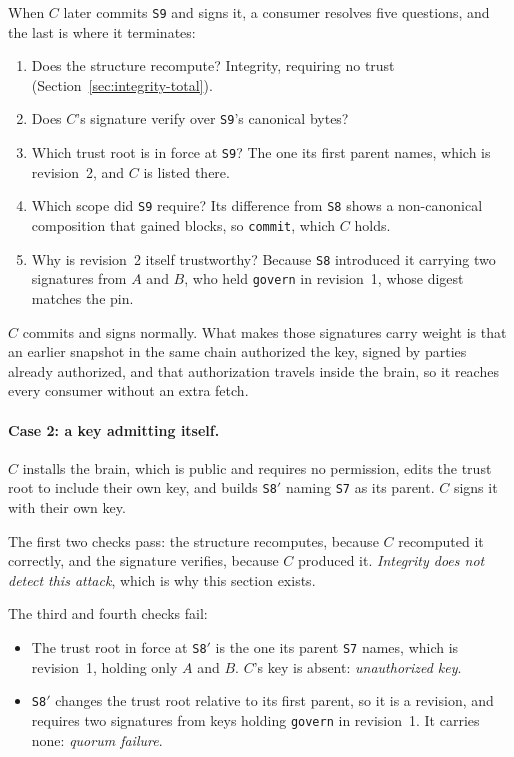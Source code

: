 \documentclass[11pt,a4paper]{article}
\begin{document}
When $C$ later commits \texttt{S9} and signs it, a consumer resolves five
questions, and the last is where it terminates:

\begin{enumerate}[leftmargin=1.6em]
  \item Does the structure recompute? Integrity, requiring no trust
  (Section~\ref{sec:integrity-total}).
  \item Does $C$'s signature verify over \texttt{S9}'s canonical bytes?
  \item Which trust root is in force at \texttt{S9}? The one its first parent
  names, which is revision~2, and $C$ is listed there.
  \item Which scope did \texttt{S9} require? Its difference from \texttt{S8}
  shows a non-canonical composition that gained blocks, so \texttt{commit},
  which $C$ holds.
  \item Why is revision~2 itself trustworthy? Because \texttt{S8} introduced it
  carrying two signatures from $A$ and $B$, who held \texttt{govern} in
  revision~1, whose digest matches the pin.
\end{enumerate}

$C$ commits and signs normally. What makes those signatures carry weight is
that an earlier snapshot in the same chain authorized the key, signed by
parties already authorized, and that authorization travels inside the brain,
so it reaches every consumer without an extra fetch.

\paragraph{Case 2: a key admitting itself.}
$C$ installs the brain, which is public and requires no permission, edits the
trust root to include their own key, and builds \texttt{S8$'$} naming \texttt{S7}
as its parent. $C$ signs it with their own key.

The first two checks pass: the structure recomputes, because $C$ recomputed it
correctly, and the signature verifies, because $C$ produced it.
\emph{Integrity does not detect this attack}, which is why this section
exists.

The third and fourth checks fail:

\begin{itemize}[leftmargin=1.4em]
  \item The trust root in force at \texttt{S8$'$} is the one its parent
  \texttt{S7} names, which is revision~1, holding only $A$ and $B$. $C$'s key is
  absent: \emph{unauthorized key}.
  \item \texttt{S8$'$} changes the trust root relative to its first parent, so it
  is a revision, and requires two signatures from keys holding \texttt{govern} in
  revision~1. It carries none: \emph{quorum failure}.
\end{itemize}
\end{document}

